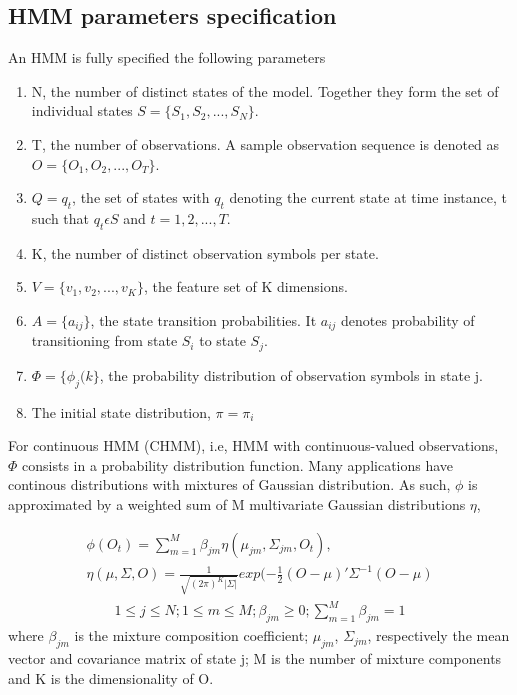 \subsection{HMM parameters specification}
An HMM is fully specified the following parameters 
\begin{enumerate}
	\item N, the number of distinct states of the model. Together they form the set of individual states \(S = \{S_1, S_2, ..., S_N\}\).
	\item T, the number of observations. A sample observation sequence is denoted as \(O = \{O_1, O_2, ..., O_T\}\).
	\item \(Q = {q_t}\), the set of states with \(q_t\) denoting the current state at time instance, t such that \(q_t \epsilon S\) and \(t = 1, 2, ..., T\).
	\item K, the number of distinct observation symbols per state. 
	\item \(V = \{v_1, v_2, ..., v_K\}\), the feature set of K dimensions.
	\item \(A =  \{a_{ij} \}\), the state transition probabilities. It \(a_{ij}\)  denotes probability of transitioning from state \(S_i\) to state \(S_j\).
	\item \(\Phi =   \{ \phi_{j}(k\}\), the probability distribution of observation symbols in state j.
	\item The initial state distribution, \(\pi = \pi_i\)
\end{enumerate}
For continuous HMM (CHMM), i.e, HMM with continuous-valued observations, \(\Phi\) consists in a probability distribution function. Many applications have continous distributions with mixtures of Gaussian distribution. %
As such, \(\phi\) is approximated by a weighted sum of M multivariate Gaussian distributions \(\eta\),

\begin{align} \label{eq:mix}
	\phi(O_t) = \sum_{m=1}^M \beta_{jm} \eta(\mu_{jm}, \Sigma_{jm}, O_t), \\
	\eta(\mu, \Sigma, O) = \frac{1}{\sqrt{(2\pi)^K|\Sigma|}}exp(-\frac{1}{2}(O-\mu)'\Sigma^{-1}(O-\mu)
\end{align} 
\begin{align*}
	1 \leq j \leq N; 1 \leq m  \leq M; \beta_{jm} \geq 0; \sum_{m=1}^{M}\beta_{jm} = 1
\end{align*}
where \(\beta_{jm}\) is the mixture composition coefficient; \(\mu_{jm}\), \(\Sigma_{jm}\), respectively the mean vector and covariance matrix of state j; M is the number of mixture components and K is the dimensionality of O.

